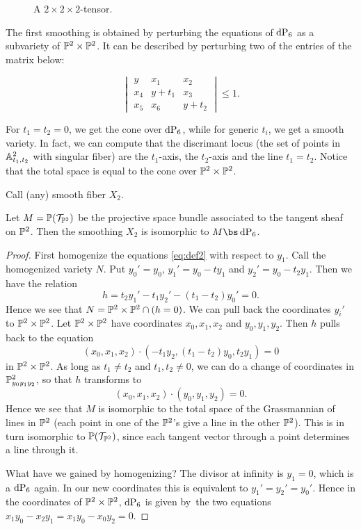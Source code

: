 \begin{figure}[b]
\centering

\caption{A $2 \times 2 \times 2$-tensor.}
\label{fig:p1p1p1_equations}
\end{figure}

The first smoothing is obtained by perturbing the equations of $\dP6$ as a subvariety of $\P^2 \times \P^2$.  It can be described by perturbing two of the entries of the matrix below:

\begin{equation}
\label{eq:def2}
\begin{vmatrix}
y & x_1 & x_2 \\
x_4 & y+t_1 & x_3 \\
x_5 & x_6 & y+t_2
\end{vmatrix} \leq 1.
\end{equation}


For $t_1=t_2=0$, we get the cone over $\dP6$, while for generic $t_i$, we get a smooth variety. In fact, we can compute that the discrimant locus (the set of points in $\A^2_{t_1,t_2}$ with singular fiber) are the $t_1$-axis, the $t_2$-axis and the line $t_1=t_2$. Notice that the total space is equal to the cone over $\P^2 \times \P^2$.

Call (any) smooth fiber $X_2$. 

\begin{lemma}
Let $M=\P(\mathcal T_ {\P^2})$ be the projective space bundle associated to the tangent sheaf on $\P^2$. Then the smoothing $X_2$ is isomorphic to $M \bs \dP6$. 
\end{lemma}
\begin{proof}
First homogenize the equations \eqref{eq:def2} with respect to $y_1$. Call the homogenized variety $N$. Put $y_0'=y_0$, $y_1' = y_0-ty_1$ and $y_2'=y_0-t_2y_1$. Then we have the relation
\[
h = t_2y_1'-t_1y_2' - (t_1-t_2)y_0' = 0.
\]
Hence we see that $N=\P^2 \times \P^2 \cap (h = 0)$. We can pull back the coordinates $y_i'$ to $\P^2 \times \P^2$. Let $\P^2 \times \P^2$ have coordinates $x_0,x_1,x_2$ and $y_0,y_1,y_2$. Then $h$ pulls back to the equation
\[
(x_0,x_1,x_2) \cdot (-t_1y_2, (t_1-t_2)y_0,t_2y_1) = 0
\]
in $\P^2 \times \P^2$. As long as $t_1 \neq t_2$ and $t_1,t_2 \neq 0$, we can do a change of coordinates in $\P^2_{y_0y_1y_2}$, so that $h$ transforms to
\[
(x_0,x_1,x_2) \cdot(y_0,y_1,y_2) = 0.
\]
Hence we see that $M$ is isomorphic to the total space of the Grassmannian of lines in $\P^2$ (each point in one of the $\P^2$'s give a line in the other $\P^2$). This is in turn isomorphic to $\P(\mathcal T_{\P^2})$, since each tangent vector through a point determines a line through it.

What have we gained by homogenizing? The divisor at infinity is $y_1=0$, which is a $\dP6$ again. In our new coordinates this is equivalent to $y_1'=y_2'=y_0'$. Hence in the coordinates of $\P^2 \times \P^2$, $\dP6$ is given by the two equations $x_1y_0-x_2y_1=x_1y_0-x_0y_2=0$. 
\end{proof}

